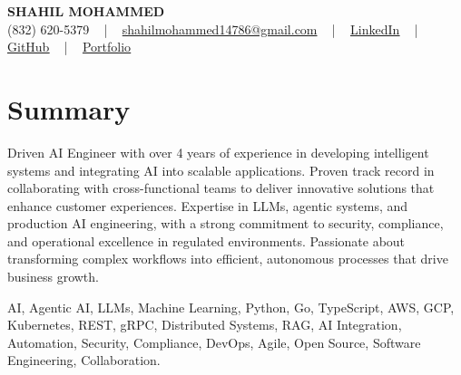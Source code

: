\documentclass[letterpaper,10pt]{article}
\begin{document}
\begin{center}
    {\fontsize{14pt}{12pt}\selectfont \textbf{\MakeUppercase{Shahil Mohammed}}}\\ \vspace{2pt}
    \fontsize{10pt}{12pt}\selectfont (832) 620-5379 ~ | ~ \href{mailto:shahilmohammed14786@gmail.com}{shahilmohammed14786@gmail.com} ~ | ~  
    \href{https://www.linkedin.com/in/shahil-mohammed-9652931a1/}{\color{blue}\underline{LinkedIn}}  ~ | ~ 
    \href{https://github.com/freakbeast14}{\color{blue}\underline{GitHub}} ~ | ~ 
    \href{https://shahil-mohammed.netlify.app/}{\color{blue}\underline{Portfolio}}
    \vspace{-8pt}
\end{center}

\section{Summary}
\vspace{-2pt}\fontsize{8pt}{9pt}\selectfont
Driven AI Engineer with over 4 years of experience in developing intelligent systems and integrating AI into scalable applications. Proven track record in collaborating with cross-functional teams to deliver innovative solutions that enhance customer experiences. Expertise in LLMs, agentic systems, and production AI engineering, with a strong commitment to security, compliance, and operational excellence in regulated environments. Passionate about transforming complex workflows into efficient, autonomous processes that drive business growth.
 \vspace{-5pt}
 
{\fontsize{1pt}{1pt}\selectfont\color{white}
AI, Agentic AI, LLMs, Machine Learning, Python, Go, TypeScript, AWS, GCP, Kubernetes, REST, gRPC, Distributed Systems, RAG, AI Integration, Automation, Security, Compliance, DevOps, Agile, Open Source, Software Engineering, Collaboration.
}
\vspace{-8pt}

\vspace{-2pt}
\end{document}
